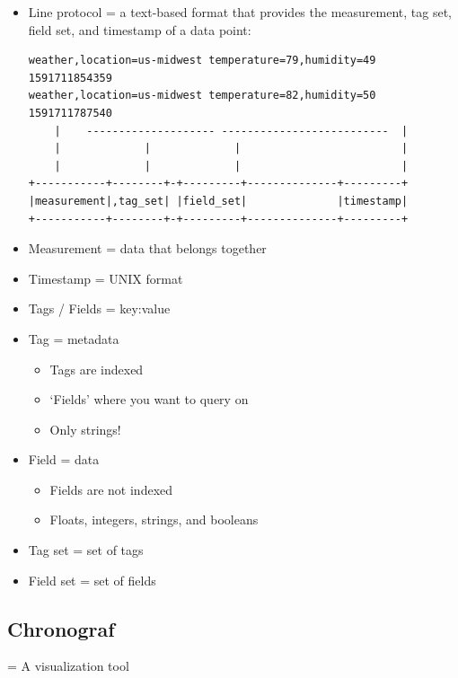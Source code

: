 \documentclass{article}
\begin{document}
\begin{itemize}
    \item Line protocol = a text-based format that provides the measurement, tag set, field set, and timestamp of a data point:
\begin{verbatim}
weather,location=us-midwest temperature=79,humidity=49 1591711854359    
weather,location=us-midwest temperature=82,humidity=50 1591711787540   
    |    -------------------- --------------------------  |
    |             |             |                         |
    |             |             |                         |
+-----------+--------+-+---------+--------------+---------+
|measurement|,tag_set| |field_set|              |timestamp|
+-----------+--------+-+---------+--------------+---------+
\end{verbatim}
    \item Measurement = data that belongs together
    \item Timestamp = UNIX format
    \item Tags / Fields = key:value
    \item Tag = metadata
    \begin{itemize}
        \item Tags are indexed
        \item `Fields' where you want to query on
        \item Only strings!
    \end{itemize}
    \item Field = data
    \begin{itemize}
        \item Fields are not indexed
        \item Floats, integers, strings, and booleans
    \end{itemize}
    \item Tag set = set of tags
    \item Field set = set of fields
\end{itemize}

\subsection{Chronograf}

= A visualization tool
\end{document}
